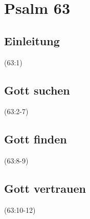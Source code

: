 \documentclass[14pt]{../../inc/mybib}
\author{Lothar Schmid}
\begin{document}
\setlength{\baselineskip}{1.5\baselineskip}

\section*{Psalm 63}
    \subsection{Einleitung}
    (63:1)
    \subsection{Gott suchen}
    (63:2-7)
    \subsection{Gott finden}
    (63:8-9)
    \subsection{Gott vertrauen}
    (63:10-12)

    \begin{block}[Einleitung]
    \end{block}
\end{document}
